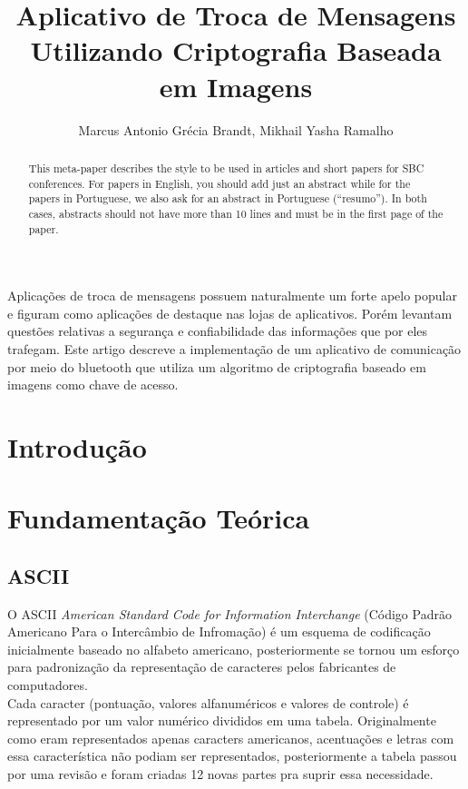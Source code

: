 \documentclass[12pt]{article}
\title{Aplicativo de Troca de Mensagens Utilizando Criptografia Baseada em
Imagens}
\author{Marcus Antonio Grécia Brandt\inst{1}, Mikhail Yasha Ramalho \inst{1}}
\begin{document}
 

\maketitle

\begin{abstract}
  This meta-paper describes the style to be used in articles and short papers
  for SBC conferences. For papers in English, you should add just an abstract
  while for the papers in Portuguese, we also ask for an abstract in
  Portuguese (``resumo''). In both cases, abstracts should not have more than
  10 lines and must be in the first page of the paper.
\end{abstract}
     
\begin{resumo} 
  Aplicações de troca de mensagens possuem naturalmente um forte apelo popular
  e figuram como aplicações de destaque nas lojas de aplicativos. Porém levantam
  questões relativas a segurança e confiabilidade das informações que por eles
  trafegam. Este artigo descreve a implementação de um aplicativo de comunicação
  por meio do bluetooth que utiliza um algoritmo de criptografia baseado em
  imagens como chave de acesso.
\end{resumo}

\section{Introdução}

\section{Fundamentação Teórica} \label{sec:firstpage}

\subsection{ASCII}
O ASCII \textit{American Standard Code for Information Interchange} (Código Padrão Americano Para o Intercâmbio de Infromação) é um esquema de codificação inicialmente baseado no alfabeto americano, posteriormente se tornou um esforço para padronização da representação de caracteres pelos fabricantes de computadores.
\\Cada caracter (pontuação, valores alfanuméricos e valores de controle) é representado por um valor numérico divididos em uma tabela. Originalmente como eram representados apenas caracters americanos, acentuações e letras com essa característica não podiam ser representados, posteriormente a tabela passou por uma revisão e foram criadas 12 novas partes pra suprir essa necessidade.
\end{document}
